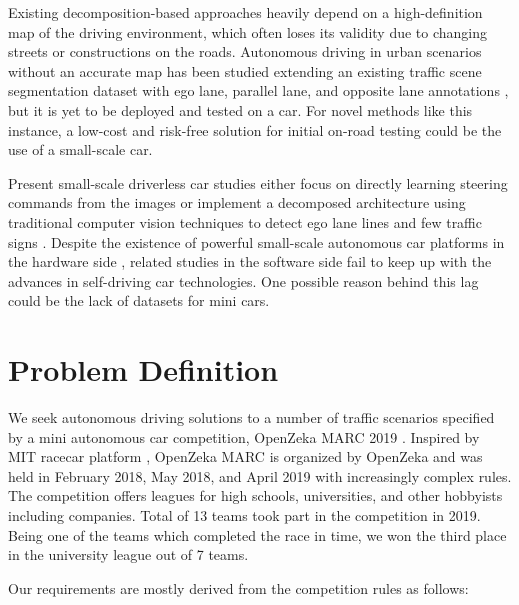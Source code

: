 Existing decomposition-based approaches heavily depend on a high-definition map
of the driving environment, which often loses its validity due to changing
streets or constructions on the roads. Autonomous driving in urban scenarios
without an accurate map has been studied extending an existing traffic scene
segmentation dataset with ego lane, parallel lane, and opposite lane
annotations \cite{Meyer2018DeepSL}, but it is yet to be deployed and tested on
a car. For novel methods like this instance, a low-cost and risk-free solution
for initial on-road testing could be the use of a small-scale car.

Present small-scale driverless car studies either focus on directly learning
steering commands from the images \cite{Bechtel2017DeepPicarAL,
Do2018RealTimeSC} or implement a decomposed architecture using traditional
computer vision techniques to detect ego lane lines and few traffic signs
\cite{Blaga2018MiniatureAV}. Despite the existence of powerful small-scale
autonomous car platforms in the hardware side \cite{Karaman2017ProjectbasedCA},
related studies in the software side fail to keep up with the advances in
self-driving car technologies. One possible reason behind this lag could be the
lack of datasets for mini cars.


\section{Problem Definition}

We seek autonomous driving solutions to a number of traffic scenarios specified
by a mini autonomous car competition, OpenZeka MARC 2019 \cite{OpenZekaMARC}.
Inspired by MIT racecar platform \cite{Karaman2017ProjectbasedCA}, OpenZeka
MARC is organized by OpenZeka and was held in February 2018, May 2018, and
April 2019 with increasingly complex rules. The competition offers leagues for
high schools, universities, and other hobbyists including companies. Total of
13 teams took part in the competition in 2019. Being one of the teams which
completed the race in time, we won the third place in the university league out
of 7 teams.

Our requirements are mostly derived from the competition rules as follows:

